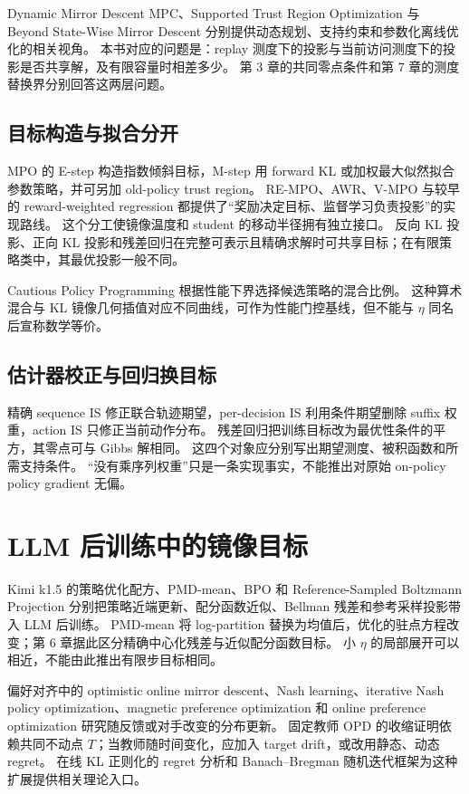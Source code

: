 Dynamic Mirror Descent MPC、Supported Trust Region Optimization 与 Beyond State-Wise Mirror Descent 分别提供动态规划、支持约束和参数化离线优化的相关视角\cite{dynamicmd21,stro23,beyondstate26}。
本书对应的问题是：replay 测度下的投影与当前访问测度下的投影是否共享解，及有限容量时相差多少。
第 3 章的共同零点条件和第 7 章的测度替换界分别回答这两层问题。

\subsection{目标构造与拟合分开}
MPO 的 E-step 构造指数倾斜目标，M-step 用 forward KL 或加权最大似然拟合参数策略，并可另加 old-policy trust region\cite{mpo18}。
RE-MPO、AWR、V-MPO 与较早的 reward-weighted regression 都提供了“奖励决定目标、监督学习负责投影”的实现路线\cite{rempo18,awr19,vmpo19,rwr07}。
这个分工使镜像温度和 student 的移动半径拥有独立接口。
反向 KL 投影、正向 KL 投影和残差回归在完整可表示且精确求解时可共享目标；在有限策略类中，其最优投影一般不同。

Cautious Policy Programming 根据性能下界选择候选策略的混合比例\cite{cpp23}。
这种算术混合与 KL 镜像几何插值对应不同曲线，可作为性能门控基线，但不能与 $\eta$ 同名后宣称数学等价。

\subsection{估计器校正与回归换目标}
精确 sequence IS 修正联合轨迹期望，per-decision IS 利用条件期望删除 suffix 权重，action IS 只修正当前动作分布。
残差回归把训练目标改为最优性条件的平方，其零点可与 Gibbs 解相同。
这四个对象应分别写出期望测度、被积函数和所需支持条件。
“没有乘序列权重”只是一条实现事实，不能推出对原始 on-policy policy gradient 无偏。

\section{LLM 后训练中的镜像目标}
Kimi k1.5 的策略优化配方、PMD-mean、BPO 和 Reference-Sampled Boltzmann Projection 分别把策略近端更新、配分函数近似、Bellman 残差和参考采样投影带入 LLM 后训练\cite{kimi25,pmdmean26,bpo26,rsbp26}。
PMD-mean 将 log-partition 替换为均值后，优化的驻点方程改变；第 6 章据此区分精确中心化残差与近似配分函数目标。
小 $\eta$ 的局部展开可以相近，不能由此推出有限步目标相同。

偏好对齐中的 optimistic online mirror descent、Nash learning、iterative Nash policy optimization、magnetic preference optimization 和 online preference optimization 研究随反馈或对手改变的分布更新\cite{optimisticllm25,nashhf23,inash24,magnetic25,onlinepref24}。
固定教师 OPD 的收缩证明依赖共同不动点 $T$；当教师随时间变化，应加入 target drift，或改用静态、动态 regret。
在线 KL 正则化的 regret 分析和 Banach--Bregman 随机迭代框架为这种扩展提供相关理论入口\cite{logregkl25,banach25}。

